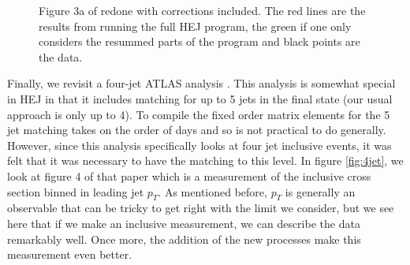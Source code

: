 \begin{figure}[t]
\caption{Figure 3a of \cite{Aad2014} redone with corrections included. The red lines are the results from running the full HEJ program, the green if one only considers the resummed parts of the program and black points are the data.}
\label{fig:newveto3a}
\end{figure}

Finally, we revisit a four-jet ATLAS analysis \cite{Aad2015}. This analysis is somewhat special in HEJ in that it includes matching for up to 5 jets in the final state (our usual approach is only up to 4). To compile the fixed order matrix elements for the 5 jet matching takes on the order of days and so is not practical to do generally. However, since this analysis specifically looks at four jet inclusive events, it was felt that it was necessary to have the matching to this level. In figure \ref{fig:4jet}, we look at figure 4 of that paper which is a measurement of the inclusive cross section binned in leading jet $p_T$. As mentioned before, $p_T$ is generally an observable that can be tricky to get right with the limit we consider, but we see here that if we make an inclusive measurement, we can describe the data remarkably well. Once more, the addition of the new processes make this measurement even better. 

